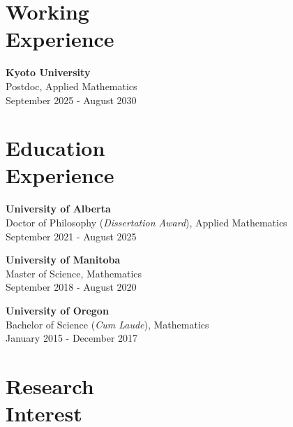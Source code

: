 \documentclass[margin]{res}
\begin{document}
\begin{resume}


\section{Working\\Experience}
\textbf{Kyoto University}\\
Postdoc, Applied Mathematics\\
September 2025 - August 2030 














\section{Education\\Experience}
\textbf{University of Alberta}\\
Doctor of Philosophy ({\sl Dissertation Award}), Applied Mathematics\\
September 2021 - August 2025


\textbf{University of Manitoba}\\
Master of Science, Mathematics\\
September 2018 - August 2020 


\textbf{University of Oregon} \\
Bachelor of Science ({\sl Cum Laude}), Mathematics\\
January 2015 - December 2017





\section{Research\\Interest}


\end{resume}
\end{document}
